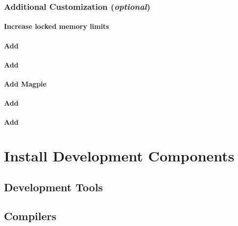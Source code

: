 \documentclass[letterpaper]{article}
\begin{document}
\subsubsection{Additional Customization ({\em optional})} \label{sec:addl_customizations}


\paragraph{Increase locked memory limits}


\paragraph{Add \clustershell{}}


\paragraph{Add \genders{}}


\paragraph{Add Magpie}


\paragraph{Add \conman{}} \label{sec:add_conman}


\paragraph{Add \nhc{}} \label{sec:add_nhc}


\section{Install \OHPC{} Development Components}


\subsection{Development Tools} \label{sec:install_dev_tools}


\vspace*{-0.15cm}
\subsection{Compilers} \label{sec:install_compilers}

\end{document}
